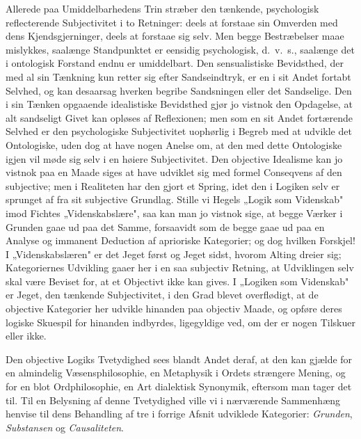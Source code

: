 \documentclass[12pt]{book}
\newcommand{\opage}[1]{\marginnote{\footnotesize\textit{[#1]}}}
\begin{document}
Allerede paa Umiddelbarhedens Trin stræber den tænkende, psychologisk reflecterende
Subjectivitet i to Retninger: deels at forstaae sin Omverden med dens Kjendsgjerninger,
deels at forstaae sig selv. Men begge Bestræbelser maae mislykkes, saalænge Standpunktet
er eensidig psychologisk, d.\ v.\ s., saalænge det i ontologisk Forstand endnu er
umiddelbart. Den sensualistiske Bevidsthed, der med al sin Tænkning kun retter sig efter
Sandseindtryk, er en i sit Andet fortabt Selvhed, og kan desaarsag hverken begribe
Sandsningen eller det Sandselige. Den i sin Tænken opgaaende idealistiske Bevidsthed gjør
jo vistnok den Opdagelse, at alt sandseligt Givet kan opløses af Reflexionen; men som en
\opage{134} sit Andet fortærende Selvhed er den psychologiske Subjectivitet uophørlig i Begreb med at
udvikle det Ontologiske, uden dog at have nogen Anelse om, at den med dette Ontologiske
igjen vil møde sig selv i en høiere Subjectivitet. Den objective Idealisme kan jo vistnok
paa en Maade siges at have udviklet sig med formel Conseqvens af den subjective; men i
Realiteten har den gjort et Spring, idet den i Logiken selv er sprunget af fra sit
subjective Grundlag. Stille vi Hegels „Logik som Videnskab" imod Fichtes
„Videnskabslære", saa kan man jo vistnok sige, at begge Værker i Grunden gaae ud paa det
Samme, forsaavidt som de begge gaae ud paa en Analyse og immanent Deduction af aprioriske
Kategorier; og dog hvilken Forskjel! I „Videnskabslæren" er det Jeget først og Jeget
sidst, hvorom Alting dreier sig; Kategoriernes Udvikling gaaer her i en saa subjectiv
Retning, at Udviklingen selv skal være Beviset for, at et Objectivt ikke kan gives. I
„Logiken som Videnskab" er Jeget, den tænkende Subjectivitet, i den Grad blevet
overflødigt, at de objective Kategorier her udvikle hinanden paa objectiv Maade, og opføre
deres logiske Skuespil for hinanden indbyrdes, ligegyldige ved, om der er nogen Tilskuer
eller ikke.

Den objective Logiks Tvetydighed sees blandt Andet deraf, at den kan gjælde for en
almindelig Væsensphilosophie, en Metaphysik i Ordets strængere Mening, og for en blot
Ordphilosophie, en Art dialektisk Synonymik, eftersom man tager det til. Til en Belysning
af denne Tvetydighed ville vi i nærværende Sammenhæng henvise til dens Behandling af tre i
forrige Afsnit udviklede Kategorier: \emph{Grunden}, \emph{Substansen} og
\emph{Causaliteten}.
\end{document}
